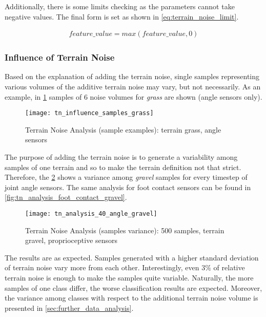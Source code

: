 Additionally, there is some limits checking as the parameters cannot take negative values. The final form is set as shown in \cref{eq:terrain_noise_limit}.

\begin{align} \label{eq:terrain_noise_limit}
feature\_value = max(feature\_value, 0)
\end{align}

\subsubsection*{Influence of Terrain Noise} \label{sssec:terrain_noise_influence}
Based on the explanation of adding the terrain noise, single samples representing various volumes of the additive terrain noise may vary, but not necessarily. As an example, in \cref{fig:tn_influence_samples_grass} samples of $ 6 $ noise volumes for \textit{grass} are shown (angle sensors only). 

\begin{figure}[H]
  \centering
  \texttt{[image: tn\_influence\_samples\_grass]}
  \caption{Terrain Noise Analysis (sample examples): terrain grass, angle sensors}
  \label{fig:tn_influence_samples_grass}
\end{figure}

The purpose of adding the terrain noise is to generate a variability among samples of one terrain and so to make the terrain definition not that strict. Therefore, the \cref{fig:tn_analysis_angle_gravel} shows a variance among \textit{gravel} samples for every timestep of joint angle sensors. The same analysis for foot contact sensors can be found in \cref{fig:tn_analysis_foot_contact_gravel}.

\begin{figure}[H]
  \centering
  \texttt{[image: tn\_analysis\_40\_angle\_gravel]}
  \caption{Terrain Noise Analysis (samples variance): 500 samples, terrain gravel, proprioceptive sensors}
  \label{fig:tn_analysis_angle_gravel}
\end{figure}

The results are as expected. Samples generated with a higher standard deviation of terrain noise vary more from each other. Interestingly, even $ 3\% $ of relative terrain noise is enough to make the samples quite variable. Naturally, the more samples of one class differ, the worse classification results are expected. Moreover, the variance among classes with respect to the additional terrain noise volume is presented in \cref{sec:further_data_analysis}.

